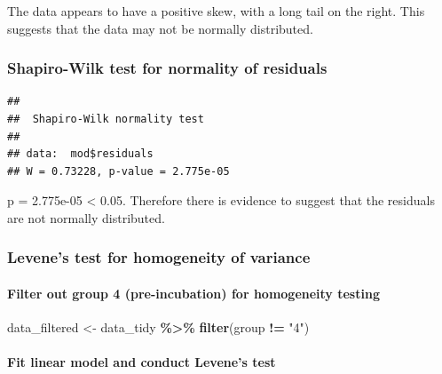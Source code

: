 \documentclass[
]{article}
\newenvironment{Shaded}{\begin{snugshade}}{\end{snugshade}}
\newcommand{\FunctionTok}[1]{\textcolor[rgb]{0.13,0.29,0.53}{\textbf{#1}}}
\newcommand{\NormalTok}[1]{#1}
\newcommand{\OtherTok}[1]{\textcolor[rgb]{0.56,0.35,0.01}{#1}}
\newcommand{\SpecialCharTok}[1]{\textcolor[rgb]{0.81,0.36,0.00}{\textbf{#1}}}
\newcommand{\StringTok}[1]{\textcolor[rgb]{0.31,0.60,0.02}{#1}}
\begin{document}
The data appears to have a positive skew, with a long tail on the right.
This suggests that the data may not be normally distributed.

\subsubsection{Shapiro-Wilk test for normality of
residuals}\label{shapiro-wilk-test-for-normality-of-residuals}

\begin{Shaded}
\end{Shaded}

\begin{verbatim}
## 
##  Shapiro-Wilk normality test
## 
## data:  mod$residuals
## W = 0.73228, p-value = 2.775e-05
\end{verbatim}

p = 2.775e-05 \textless{} 0.05. Therefore there is evidence to suggest
that the residuals are not normally distributed.

\subsubsection{Levene's test for homogeneity of
variance}\label{levenes-test-for-homogeneity-of-variance}

\paragraph{Filter out group 4 (pre-incubation) for homogeneity
testing}\label{filter-out-group-4-pre-incubation-for-homogeneity-testing}

\begin{Shaded}
\begin{Highlighting}[]
\NormalTok{data\_filtered }\OtherTok{\textless{}{-}}\NormalTok{ data\_tidy }\SpecialCharTok{\%\textgreater{}\%} \FunctionTok{filter}\NormalTok{(group }\SpecialCharTok{!=} \StringTok{"4"}\NormalTok{)}
\end{Highlighting}
\end{Shaded}

\paragraph{Fit linear model and conduct Levene's
test}\label{fit-linear-model-and-conduct-levenes-test}
\end{document}
